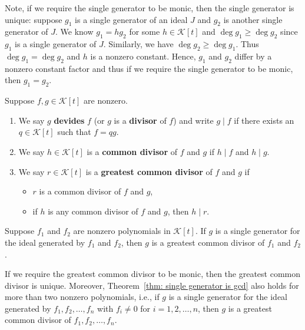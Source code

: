 \begin{remarkenv}\label{rem: uniqueness of single generator}
    Note, if we require the single generator to be monic, then the single generator is unique: suppose $g_1$ is a single generator of an ideal $J$ and $g_2$ is another single generator of $J$. We know $g_1 = h g_2$ for some $h\in \mathcal K[t]$ and $\deg g_1 \ge \deg g_2$ since $g_1$ is a single generator of $J$. Similarly, we have $\deg g_2 \ge \deg g_1$. Thus $\deg g_1 = \deg g_2$ and $h$ is a nonzero constant. Hence, $g_1$ and $g_2$ differ by a nonzero constant factor and thus if we require the single generator to be monic, then $g_1 = g_2$.
\end{remarkenv}
\begin{definitionenv}
    Suppose $f,g\in \mathcal K[t]$ are nonzero.
    \begin{enumerate}[label=(\arabic*)]
        \item We say $g$ \textbf{devides} $f$ (or $g$ is a \textbf{divisor} of $f$) and write $g \mid f$ if there exists an $q\in \mathcal K[t]$ such that $f = qg$.
        \item We say $h\in \mathcal{K}[t]$ is a \textbf{common divisor} of $f$ and $g$ if $h \mid f$ and $h \mid g$.
        \item We say $r\in \mathcal K[t]$ is a \textbf{greatest common divisor} of $f$ and $g$ if
        \begin{itemize}
            \item $r$ is a common divisor of $f$ and $g$,
            \item if $h$ is any common divisor of $f$ and $g$, then $h \mid r$.
        \end{itemize}
    \end{enumerate}
\end{definitionenv}
\begin{theoremenv}\label{thm: single generator is gcd}
    Suppose $f_1$ and $f_2$ are nonzero polynomials in $\mathcal K[t]$. If $g$ is a single generator for the ideal generated by $f_1$ and $f_2$, then $g$ is a greatest common divisor of $f_1$ and $f_2$.
\end{theoremenv}
\begin{remarkenv}\label{rem: uniqueness of gcd}
    If we require the greatest common divisor to be monic, then the greatest common divisor is unique. Moreover, Theorem~\ref{thm: single generator is gcd} also holds for more than two nonzero polynomials, i.e., if $g$ is a single generator for the ideal generated by $f_1, f_2, \ldots, f_n$ with $f_i \ne 0$ for $i = 1, 2, \ldots, n$, then $g$ is a greatest common divisor of $f_1, f_2, \ldots, f_n$.
\end{remarkenv}
